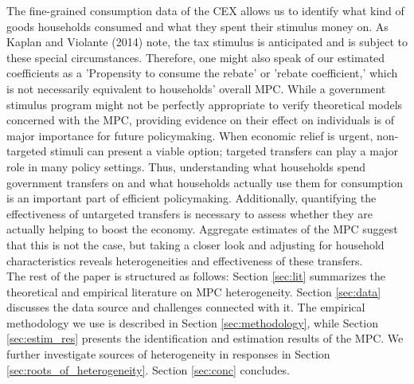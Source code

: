 The fine-grained consumption data of the CEX allows us to identify what kind of goods households consumed and what they spent their stimulus money on. As Kaplan and Violante (2014) note, the tax stimulus is anticipated and is subject to these special circumstances. Therefore, one might also speak of our estimated coefficients as a 'Propensity to consume the rebate' or 'rebate coefficient,' which is not necessarily equivalent to households' overall MPC. While a government stimulus program might not be perfectly appropriate to verify theoretical models concerned with the MPC, providing evidence on their effect on individuals is of major importance for future policymaking. When economic relief is urgent, non-targeted stimuli can present a viable option; targeted transfers can play a major role in many policy settings. Thus, understanding what households spend government transfers on and what households actually use them for consumption is an important part of efficient policymaking. Additionally, quantifying the effectiveness of untargeted transfers is necessary to assess whether they are actually helping to boost the economy. Aggregate estimates of the MPC suggest that this is not the case, but taking a closer look and adjusting for household characteristics reveals heterogeneities and effectiveness of these transfers. \\ 
The rest of the paper is structured as follows: Section \ref{sec:lit} summarizes the theoretical and empirical literature on MPC heterogeneity. Section \ref{sec:data} discusses the data source and challenges connected with it. The empirical methodology we use is described in Section \ref{sec:methodology}, while Section \ref{sec:estim_res} presents the identification and estimation results of the MPC. We further investigate sources of heterogeneity in responses in Section \ref{sec:roots_of_heterogeneity}. Section \ref{sec:conc} concludes.